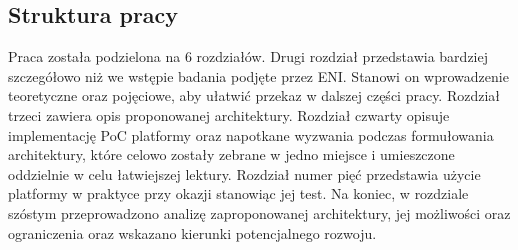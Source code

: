 \subsection{Struktura pracy}

Praca została podzielona na 6 rozdziałów. Drugi rozdział przedstawia bardziej szczegółowo niż we wstępie badania podjęte przez ENI. Stanowi on wprowadzenie teoretyczne oraz pojęciowe, aby ułatwić przekaz w dalszej części pracy. Rozdział trzeci zawiera opis proponowanej architektury. Rozdział czwarty opisuje implementację PoC platformy oraz napotkane wyzwania podczas formułowania architektury, które celowo zostały zebrane w jedno miejsce i umieszczone oddzielnie w celu łatwiejszej lektury. Rozdział numer pięć przedstawia użycie platformy w praktyce przy okazji stanowiąc jej test. Na koniec, w rozdziale szóstym przeprowadzono analizę zaproponowanej architektury, jej możliwości oraz ograniczenia oraz wskazano kierunki potencjalnego rozwoju.